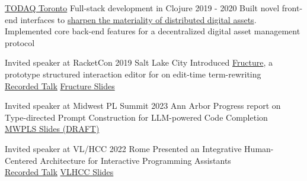 \documentclass[10pt,a4paper]{article}
\begin{document}

  \headedsubsection
    {\href{http://todaqfinance.net/}{TODAQ Toronto} \sbull Full-stack development in Clojure}
    {2019 - 2020}
    {Built novel front-end interfaces to  \href{https://andrewblinn.com/portfolio/todaq/}{sharpen the materiality of distributed digital assets}.\\Implemented core back-end features for a decentralized digital asset management protocol}


  \headedsubsection
    {Invited speaker at RacketCon}
    {2019 \sbull Salt Lake City}
    {Introduced \href{https://github.com/disconcision/fructure}{Fructure}, a prototype structured interaction editor for on edit-time term-rewriting \\
    \sbull \href{https://www.youtube.com/watch?v=CnbVCNIh1NA}{Recorded Talk}
    \sbull \href{https://github.com/disconcision/fructure/blob/master/screenshots/REAL-RacketCon-Fructure-Talk.pdf}{Fructure Slides}}

  \headedsubsection
    {Invited speaker at Midwest PL Summit}
    {2023 \sbull Ann Arbor}
    {Progress report on Type-directed Prompt Construction for LLM-powered Code Completion \\
    \sbull \href{http://andrewblinn.com/papers/DRAFT-Type-directed-Prompt-Construction-for-LLM-powered-Programming-Assistants.pdf}{MWPLS Slides (DRAFT)}}
    
  \headedsubsection
    {Invited speaker at VL/HCC}
    {2022 \sbull Rome}
    {Presented an Integrative Human-Centered Architecture for Interactive Programming Assistants \\
    \sbull \href{https://www.youtube.com/watch?v=G_9Yyut3ckw}{Recorded Talk}
    \sbull \href{https://docs.google.com/presentation/d/1lrclRzlx-ayd_iqOENyvCtnexBgTpkaSltPmgQQi_IE/edit?usp=sharing}{VLHCC Slides}}
    
\end{document}
